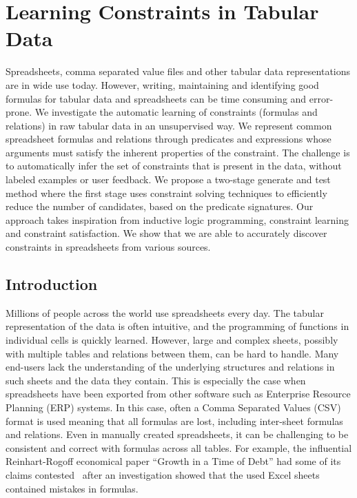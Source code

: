 \chapter{Learning Constraints in Tabular Data}\label{ch:TaCLe}
Spreadsheets, comma separated value files and other tabular data representations are in wide use today.
However, writing, maintaining and identifying good formulas for tabular data and spreadsheets can be time consuming and error-prone.
We investigate the automatic learning of constraints (formulas and relations) in raw tabular data in an unsupervised way.
We represent common spreadsheet formulas and relations through predicates and expressions whose arguments must satisfy the inherent properties of the constraint. The challenge is to automatically infer the set of constraints that is present in the data, without labeled examples or user feedback. 
We propose a two-stage generate and test method where the first stage uses constraint solving techniques to efficiently reduce the number of candidates, based on the predicate signatures. 
Our approach takes inspiration from inductive logic programming, constraint learning and constraint satisfaction.
We show that we are able to accurately discover constraints in spreadsheets from various sources.

\section{Introduction}
Millions of people across the world use spreadsheets every day.
The tabular representation of the data is often intuitive, and the programming of functions in individual cells is quickly learned.
However, large and complex sheets, possibly with multiple tables and relations between them, can be hard to handle.
Many end-users lack the understanding of the underlying structures and relations in such sheets and the data they contain.
This is especially the case when spreadsheets have been exported from other software such as Enterprise Resource Planning (ERP) systems.
In this case, often a Comma Separated Values (CSV) format is used meaning that all formulas are lost, including inter-sheet formulas and relations.
Even in manually created spreadsheets, it can be challenging to be consistent and correct with formulas across all tables.
For example, the influential Reinhart-Rogoff economical paper ``Growth in a Time of Debt'' \cite{growth_in_time_of_debt} had some of its claims contested~\cite{flaw_excel} after an investigation showed that the used Excel sheets contained mistakes in formulas.

